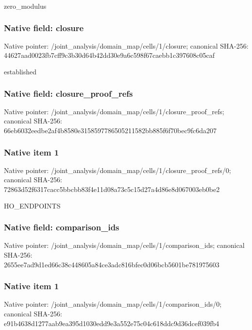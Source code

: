 \documentclass[10pt,a4paper]{article}
\begin{document}
\begingroup\raggedright\sloppy zero\_\allowbreak{}modulus\par\endgroup

\subsubsection{Native field: closure}
Native pointer: /joint\_\allowbreak{}analysis/domain\_\allowbreak{}map/cells/1/closure; canonical SHA-256: 44627aad0023fb7cff9c3b30d64b42dd30e9a6c598f67caebb1c397608c05caf

\begingroup\raggedright\sloppy established\par\endgroup

\subsubsection{Native field: closure\_\allowbreak{}proof\_\allowbreak{}refs}
Native pointer: /joint\_\allowbreak{}analysis/domain\_\allowbreak{}map/cells/1/closure\_\allowbreak{}proof\_\allowbreak{}refs; canonical SHA-256: 66eb6032eedbe2af4b8580e3158597786505211582bb885f6f70bec9fc6da207

\subsubsection{Native item 1}
Native pointer: /joint\_\allowbreak{}analysis/domain\_\allowbreak{}map/cells/1/closure\_\allowbreak{}proof\_\allowbreak{}refs/0; canonical SHA-256: 72863d52f6317cacc5bbcbb83f4e11d08a73c5c15d27a4d86e8d067003eb0be2

\begingroup\raggedright\sloppy HO\_\allowbreak{}ENDPOINTS\par\endgroup

\subsubsection{Native field: comparison\_\allowbreak{}ids}
Native pointer: /joint\_\allowbreak{}analysis/domain\_\allowbreak{}map/cells/1/comparison\_\allowbreak{}ids; canonical SHA-256: 2655ee7ad9d1ed66c38c448605a84ce3adc816bfec0d06bcb5601be781975603

\subsubsection{Native item 1}
Native pointer: /joint\_\allowbreak{}analysis/domain\_\allowbreak{}map/cells/1/comparison\_\allowbreak{}ids/0; canonical SHA-256: e91b4638d1277aab9ea395d1030edd9e3a552e75c04c618ddc9d36dcef039fb4
\end{document}
